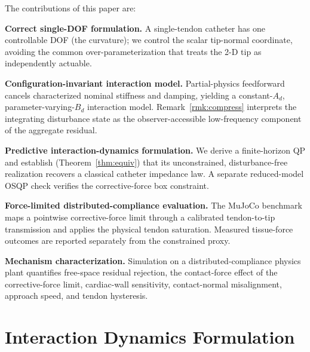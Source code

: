 The contributions of this paper are:

\textbf{Correct single-DOF formulation.} A single-tendon catheter has one controllable DOF (the curvature); we control the scalar 
tip-normal coordinate, avoiding the common over-parameterization that treats the 2-D tip as independently actuable.

\textbf{Configuration-invariant interaction model.} Partial-physics feedforward cancels characterized nominal stiffness and damping, yielding a constant-$A_d$, parameter-varying-$B_d$ interaction model. Remark~\ref{rmk:compress} interprets the integrating disturbance state as the observer-accessible low-frequency component of the aggregate residual.

\textbf{Predictive interaction-dynamics formulation.} We derive a finite-horizon QP and establish (Theorem~\ref{thm:equiv}) that its unconstrained, disturbance-free realization recovers a classical catheter impedance law. A separate reduced-model OSQP check verifies the corrective-force box constraint.

\textbf{Force-limited distributed-compliance evaluation.} The MuJoCo benchmark maps a pointwise corrective-force limit through a calibrated tendon-to-tip transmission and applies the physical tendon saturation. Measured tissue-force outcomes are reported separately from the constrained proxy.

\textbf{Mechanism characterization.} Simulation on a distributed-compliance physics plant quantifies free-space residual rejection, the contact-force effect of the corrective-force limit, cardiac-wall sensitivity, contact-normal misalignment, approach speed, and tendon hysteresis.

\section{Interaction Dynamics Formulation}\label{sec:model}


